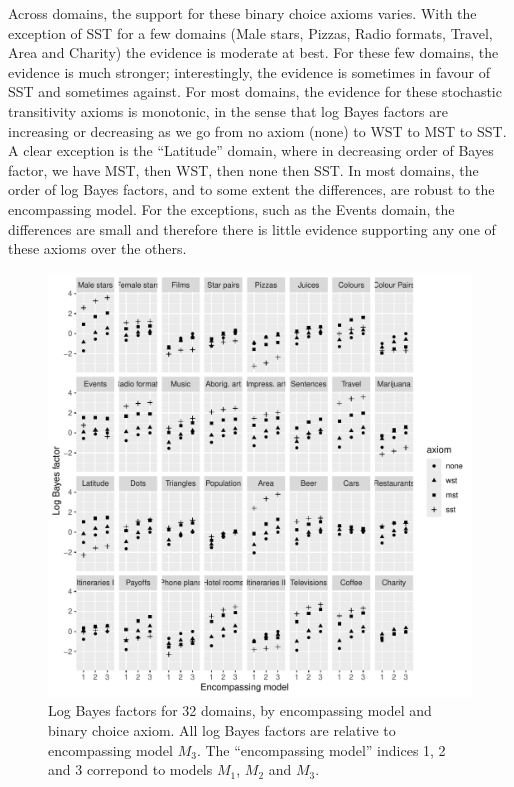 \documentclass[11pt,letter]{article}
\begin{document}
Across domains, the support for these binary choice axioms varies.
With the exception of SST for a few domains (Male stars, Pizzas, Radio formats, Travel, Area and Charity) the evidence is moderate at best.
For these few domains, the evidence is much stronger; interestingly, the evidence is sometimes in favour of SST and sometimes against.
For most domains, the evidence for these stochastic transitivity axioms is monotonic, in the sense that log Bayes factors are increasing or decreasing as we go from no axiom (none) to WST to MST to SST.
A clear exception is the ``Latitude'' domain, where in decreasing order of Bayes factor, we have MST, then WST, then none then SST.
In most domains, the order of log Bayes factors, and to some extent the differences, are robust to the encompassing model.
For the exceptions, such as the Events domain, the differences are small and therefore there is little evidence supporting any one of these axioms over the others.

\begin{figure}
	\begin{center}
	\includegraphics[width=16cm]{Figures/binary_BF}
	\caption{Log Bayes factors for 32 domains, by encompassing model and binary choice axiom. All log Bayes factors are relative to encompassing model $M_3$. The ``encompassing model'' indices 1, 2 and 3 correpond to models $M_1$, $M_2$ and $M_3$.}\label{f:binary_BF}
	\end{center}
\end{figure}
\end{document}
